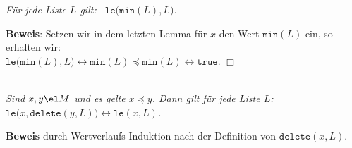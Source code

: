 \begin{Corollary} \label{l3}
{\em
  F\"ur jede Liste $L$ gilt: \ $\mathtt{le}\bigl(\mathtt{min}(L), L\bigr)$.
}
\end{Corollary}
\textbf{Beweis}: Setzen wir in dem letzten Lemma f\"ur $x$ den Wert $\mathtt{min}(L)$ ein,
so erhalten wir: \\[0.1cm]
\hspace*{1.3cm}
 $\mathtt{le}\bigl(\mathtt{min}(L), L) \leftrightarrow \mathtt{min}(L) \preceq \texttt{min}(L) \leftrightarrow \mathtt{true}$. 
\hspace*{\fill} $\Box$

\begin{Lemma} 
\label{l4} \hspace*{\fill} \\
{\em
  Sind  $x,y \el M$  und es gelte $x \preceq y$.  Dann gilt f\"ur jede Liste $L$: \\[0.1cm]
  \hspace*{1.3cm} $\mathtt{le}\bigl(x,\mathtt{delete}(y,L)\bigr) \leftrightarrow \mathtt{le}(x, L)$.
}
\end{Lemma}
\textbf{Beweis} durch Wertverlaufs-Induktion nach der Definition von $\mathtt{delete}(x,L)$.
